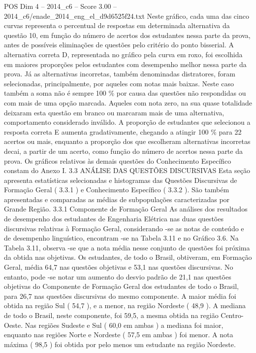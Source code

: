 \begin{textsample}{POS Dim 4 – 2014\_c6 – Score 3.00 – 2014\_c6/enade\_2014\_eng\_el\_d9d6525f24.txt}
Neste gráfico, cada uma das cinco curvas representa o percentual de respostas em determinada alternativa da questão 10, em função do número de acertos dos estudantes nessa parte da prova, antes de possíveis eliminações de questões pelo critério do ponto bisserial.
A alternativa correta D, representada no gráfico pela curva em roxo, foi escolhida em maiores proporções pelos estudantes com desempenho melhor nessa parte da prova.
Já as alternativas incorretas, também denominadas distratores, foram selecionadas, principalmente, por aqueles com notas mais baixas.
Neste caso também a soma não é sempre 100 \% por causa das questões não respondidas ou com mais de uma opção marcada.
Aqueles com nota zero, na sua quase totalidade deixaram esta questão em branco ou marcaram mais de uma alternativa, comportamento considerado inválido.
A proporção de estudantes que selecionou a resposta correta E aumenta gradativamente, chegando a atingir 100 \% para 22 acertos ou mais, enquanto a proporção dos que escolheram alternativas incorretas decai, a partir de um acerto, como função do número de acertos nessa parte da prova.
Os gráficos relativos às demais questões do Conhecimento Específico constam do Anexo I. 3.3 ANÁLISE DAS QUESTÕES DISCURSIVAS Esta seção apresenta estatísticas selecionadas e histogramas das Questões Discursivas de Formação Geral ( 3.3.1 ) e Conhecimento Específico ( 3.3.2 ).
São também apresentadas e comparadas as médias de subpopulações caracterizadas por Grande Região. 3.3.1 Componente de Formação Geral As análises dos resultados de desempenho dos estudantes de Engenharia Elétrica nas duas questões discursivas relativas à Formação Geral, considerando -se as notas de conteúdo e de desempenho linguístico, encontram -se na Tabela 3.11 e no Gráfico 3.6.
Na Tabela 3.11, observa -se que a nota média nesse conjunto de questões foi próxima da obtida nas objetivas.
Os estudantes, de todo o Brasil, obtiveram, em Formação Geral, média 64,7 nas questões objetivas e 53,1 nas questões discursivas.
No entanto, pode -se notar um aumento do desvio padrão de 21,1 nas questões objetivas do Componente de Formação Geral dos estudantes de todo o Brasil, para 26,7 nas questões discursivas do mesmo componente.
A maior média foi obtida na região Sul ( 54,7 ), e a menor, na região Nordeste ( 48,9 ).
A mediana de todo o Brasil, neste componente, foi 59,5, a mesma obtida na região Centro-Oeste.
Nas regiões Sudeste e Sul ( 60,0 em ambas ) a mediana foi maior, enquanto nas regiões Norte e Nordeste ( 57,5 em ambas ) foi menor.
A nota máxima ( 98,5 ) foi obtida por pelo menos um estudante na região Nordeste.

\end{textsample}
